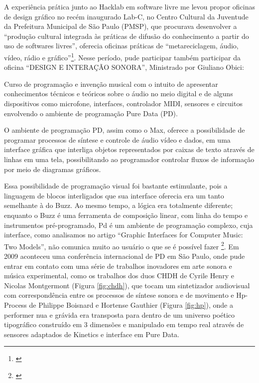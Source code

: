 A experiência prática junto ao Hacklab em software livre me levou propor oficinas de design gráfico no recém inaugurado Lab-C, no Centro Cultural da Juventude da Prefeitura Municipal de São Paulo (PMSP), que procurava desenvolver a ``produção cultural integrada às práticas de difusão do conhecimento a partir do uso de softwares livres'', oferecia oficinas práticas de ``metareciclagem, áudio, vídeo, rádio e gráfico''\footnote{\cite{PMSP2008}}. Nesse período, pude participar também participar da oficina ``DESIGN E INTERAÇÃO SONORA'', Ministrado por Giuliano Obici:
\begin{citacao}
Curso de programação e invenção musical com o intuito de apresentar conhecimentos técnicos e teóricos sobre o áudio no meio digital e de alguns dispositivos como microfone, interfaces, controlador MIDI, sensores e circuitos envolvendo o ambiente de programação Pure Data (PD).\cite{PMSP2008}
\end{citacao}

O ambiente de programação PD, assim como o Max, oferece a possibilidade de programar processos de síntese e controle de áudio vídeo e dados, em uma interface gráfica que interliga objetos representados por caixas de texto através de linhas em uma tela, possibilitando ao programador controlar fluxos de informação por meio de diagramas gráficos. 

Essa possibilidade de programação visual foi bastante estimulante, pois a linguagem de blocos interligados que sua interface oferecia era um tanto semelhante à do Buzz. Ao mesmo tempo, a lógica era totalmente diferente; enquanto o Buzz é uma ferramenta de composição linear, com linha do tempo e instrumentos pré-programado, Pd é um ambiente de programação complexo, cuja interface, como analisamos no artigo ``Graphic Interfaces for Computer Music: Two Models'', não comunica muito ao usuário o que se é possível fazer \footnote{\cite{Stolfi2016}}. 
Em 2009 aconteceu uma conferência internacional de PD em São Paulo, onde pude entrar em contato com uma série de trabalhos inovadores em arte sonora e música experimental, como os trabalhos dos duos CHDH de Cyrile Henry e Nicolas Montgermont (Figura \ref{fig:chdh}), que tocam um sintetizador audiovisual com correspondência entre os processos de síntese sonora e de movimento e Hp-Process de Philippe Boisnard e Hortense Gauthier (Figura \ref{fig:hp}), onde a performer nua e grávida era transposta para dentro de um universo poético tipográfico construído em 3 dimensões e manipulado em tempo real através de sensores adaptados de Kinetics e interface em Pure Data. 


